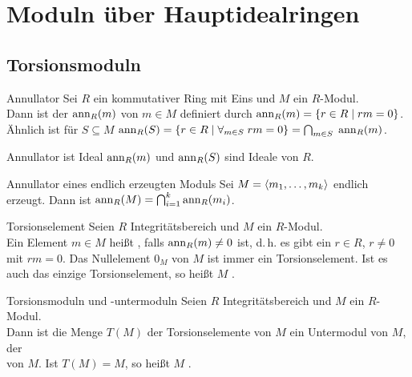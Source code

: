 \section{%
    Moduln über Hauptidealringen%
}

\subsection{%
    Torsionsmoduln%
}

\begin{Def}{Annullator}
    Sei $R$ ein kommutativer Ring mit Eins und $M$ ein $R$-Modul. \\
    Dann ist der  $\operatorname{ann}_R(m)$ von $m \in M$ definiert durch
    $\operatorname{ann}_R(m) = \{r \in R \;|\; rm = 0\}$. \\
    Ähnlich ist für $S \subseteq M$ $\operatorname{ann}_R(S) =
    \{r \in R \;|\; \forall_{m \in S}\; rm = 0\} =
    \bigcap_{m \in S}\; \operatorname{ann}_R(m)$.
\end{Def}

\begin{Lemma}{Annullator ist Ideal}
    $\operatorname{ann}_R(m)$ und $\operatorname{ann}_R(S)$ sind Ideale von $R$.
\end{Lemma}

\begin{Lemma}{Annullator eines endlich erzeugten Moduls}
    Sei $M = \langle m_1, \dotsc, m_k \rangle$ endlich erzeugt.
    Dann ist $\operatorname{ann}_R(M) = \bigcap_{i=1}^k \operatorname{ann}_R(m_i)$.
\end{Lemma}

\begin{Def}{Torsionselement}
    Seien $R$ Integritätsbereich und $M$ ein $R$-Modul. \\
    Ein Element $m \in M$ heißt , falls
    $\operatorname{ann}_R(m) \not= 0$ ist, d.\,h. es gibt ein $r \in R$, $r \not= 0$
    mit $rm = 0$.
    Das Nullelement $0_M$ von $M$ ist immer ein Torsionselement.
    Ist es auch das einzige Torsionselement, so heißt $M$
    .
\end{Def}

\begin{Def}{Torsionsmoduln und -untermoduln}
    Seien $R$ Integritätsbereich und $M$ ein $R$-Modul. \\
    Dann ist die Menge $T(M)$ der Torsionselemente von $M$ ein Untermodul
    von $M$, der \\
     von $M$.
    Ist $T(M) = M$, so heißt $M$ .
\end{Def}

